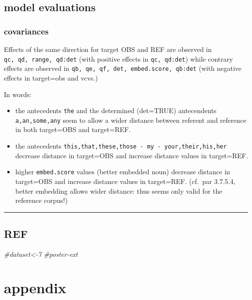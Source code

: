 \documentclass[
  12pt,
  oneside]{book}
\newenvironment{Shaded}{\begin{snugshade}}{\end{snugshade}}
\newcommand{\CommentTok}[1]{\textcolor[rgb]{0.56,0.35,0.01}{\textit{#1}}}
\providecommand{\tightlist}{%
  \setlength{\itemsep}{0pt}\setlength{\parskip}{0pt}}
\begin{document}
\section{model evaluations}\label{model-evaluations}

\subsection{covariances}\label{covariances}

Effects of the same direction for target OBS and REF are observed in \texttt{qc,\ qd,\ range,\ qd:det} (with positive effects in \texttt{qc,\ qd:det}) while contrary effects are observed in \texttt{qb,\ qe,\ qf,\ det,\ embed.score,\ qb:det} (with negative effects in target=obs and vcvs.)

In words:

\begin{itemize}
\tightlist
\item
  the antecedents \texttt{the} and the determined (det=TRUE) antecendents \texttt{a,an,some,any} seem to allow a wider distance between referent and reference in both target=OBS and target=REF.
\item
  the antecedents \texttt{this,that,these,those\ -\ my\ -\ your,their,his,her} decrease distance in target=OBS and increase distance values in target=REF.
\item
  higher \texttt{embed.score} values (better embedded noun) decrease distance in target=OBS and increase distance values in target=REF. (cf.~par 3.7.5.4, better embedding allows wider distance: thus seems only valid for the reference corpus!)
\end{itemize}

\begin{center}\rule{0.5\linewidth}{0.5pt}\end{center}

\section{REF}\label{ref}

\begin{Shaded}
\begin{Highlighting}[]
\CommentTok{\#dataset\textless{}{-}7}
\CommentTok{\#poster{-}ext}
\end{Highlighting}
\end{Shaded}

\chapter{appendix}\label{appendix}
\end{document}
